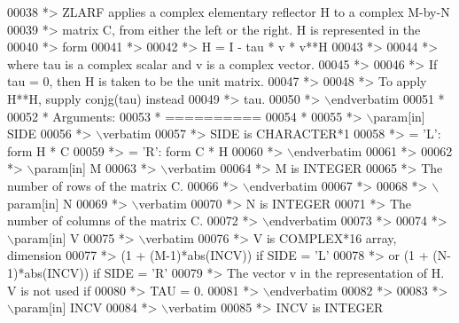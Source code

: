 \begin{DoxyCode}
00038 \textcolor{comment}{*> ZLARF applies a complex elementary reflector H to a complex M-by-N}
00039 \textcolor{comment}{*> matrix C, from either the left or the right. H is represented in the}
00040 \textcolor{comment}{*> form}
00041 \textcolor{comment}{*>}
00042 \textcolor{comment}{*>       H = I - tau * v * v**H}
00043 \textcolor{comment}{*>}
00044 \textcolor{comment}{*> where tau is a complex scalar and v is a complex vector.}
00045 \textcolor{comment}{*>}
00046 \textcolor{comment}{*> If tau = 0, then H is taken to be the unit matrix.}
00047 \textcolor{comment}{*>}
00048 \textcolor{comment}{*> To apply H**H, supply conjg(tau) instead}
00049 \textcolor{comment}{*> tau.}
00050 \textcolor{comment}{*> \(\backslash\)endverbatim}
00051 \textcolor{comment}{*}
00052 \textcolor{comment}{*  Arguments:}
00053 \textcolor{comment}{*  ==========}
00054 \textcolor{comment}{*}
00055 \textcolor{comment}{*> \(\backslash\)param[in] SIDE}
00056 \textcolor{comment}{*> \(\backslash\)verbatim}
00057 \textcolor{comment}{*>          SIDE is CHARACTER*1}
00058 \textcolor{comment}{*>          = 'L': form  H * C}
00059 \textcolor{comment}{*>          = 'R': form  C * H}
00060 \textcolor{comment}{*> \(\backslash\)endverbatim}
00061 \textcolor{comment}{*>}
00062 \textcolor{comment}{*> \(\backslash\)param[in] M}
00063 \textcolor{comment}{*> \(\backslash\)verbatim}
00064 \textcolor{comment}{*>          M is INTEGER}
00065 \textcolor{comment}{*>          The number of rows of the matrix C.}
00066 \textcolor{comment}{*> \(\backslash\)endverbatim}
00067 \textcolor{comment}{*>}
00068 \textcolor{comment}{*> \(\backslash\)param[in] N}
00069 \textcolor{comment}{*> \(\backslash\)verbatim}
00070 \textcolor{comment}{*>          N is INTEGER}
00071 \textcolor{comment}{*>          The number of columns of the matrix C.}
00072 \textcolor{comment}{*> \(\backslash\)endverbatim}
00073 \textcolor{comment}{*>}
00074 \textcolor{comment}{*> \(\backslash\)param[in] V}
00075 \textcolor{comment}{*> \(\backslash\)verbatim}
00076 \textcolor{comment}{*>          V is COMPLEX*16 array, dimension}
00077 \textcolor{comment}{*>                     (1 + (M-1)*abs(INCV)) if SIDE = 'L'}
00078 \textcolor{comment}{*>                  or (1 + (N-1)*abs(INCV)) if SIDE = 'R'}
00079 \textcolor{comment}{*>          The vector v in the representation of H. V is not used if}
00080 \textcolor{comment}{*>          TAU = 0.}
00081 \textcolor{comment}{*> \(\backslash\)endverbatim}
00082 \textcolor{comment}{*>}
00083 \textcolor{comment}{*> \(\backslash\)param[in] INCV}
00084 \textcolor{comment}{*> \(\backslash\)verbatim}
00085 \textcolor{comment}{*>          INCV is INTEGER}

\end{DoxyCode}
